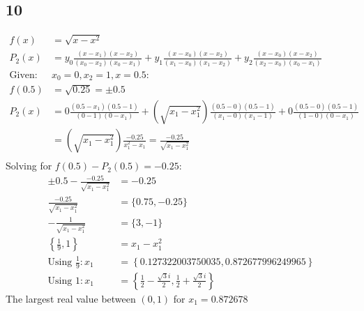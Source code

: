 \documentclass{oisinclass}
\begin{document}
\subsection*{10}
\begin{align*}
	f(x)           & = \sqrt{x - x^2}                                                                                                                                                   \\
	P_2(x)         & = y_0\frac{(x - x_1)(x-x_2)}{(x_0-x_2)(x_0 - x_1)} + y_1\frac{(x - x_0)(x-x_2)}{(x_1-x_0)(x_1 - x_2)} + y_2\frac{(x - x_0)(x-x_2)}{(x_2-x_0)(x_0 - x_1)}           \\
	\text{Given: } & x_0 = 0, x_2 = 1, x = 0.5:                                                                                                                                         \\
	f(0.5)         & = \sqrt{0.25} = \pm 0.5                                                                                                                                            \\
	P_2(x)         & = 0\frac{(0.5 - x_1)(0.5-1)}{(0-1)(0 - x_1)} + \left(\sqrt{x_1 - x_1^2}\right)\frac{(0.5 - 0)(0.5-1)}{(x_1-0)(x_1 - 1)} + 0\frac{(0.5 - 0)(0.5-1)}{(1-0)(0 - x_1)} \\
	               & = \left(\sqrt{x_1 - x_1^2}\right)\frac{-0.25}{x_1^2 - x_1} = \frac{-0.25}{\sqrt{x_1 - x_1^2}}                                                                      \\
\end{align*}
Solving for \(f(0.5) - P_2(0.5) = -0.25\):
\begin{align*}
	\pm 0.5 - \frac{-0.25}{\sqrt{x_1 - x_1^2}} & = -0.25                                                                                 \\
	\frac{-0.25}{\sqrt{x_1 - x_1^2}}           & = \{0.75, -0.25\}                                                                       \\
	-\frac{1}{\sqrt{x_1 - x_1^2}}              & = \{3, -1\}                                                                             \\
	\left\{\frac{1}{9}, 1\right\}              & = x_1 - x_1^2                                                                           \\
	\text{Using } \frac{1}{9}: x_1             & = \left\{0.127322003750035, 0.872677996249965\right\}                                   \\
	\text{Using } 1: x_1                       & = \left\{\frac{1}{2} - \frac{\sqrt{3} i}{2}, \frac{1}{2} + \frac{\sqrt{3} i}{2}\right\}
\end{align*}
The largest real value between \((0, 1)\) for \(x_1 = 0.872678\)
\newpage
\end{document}

